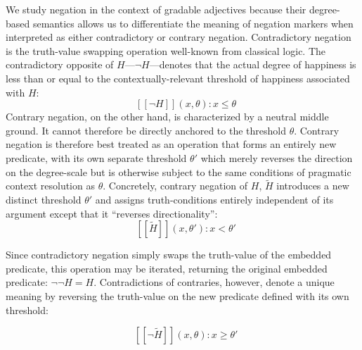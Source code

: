 \documentclass[floatsintext,doc]{apa6}
\begin{document}
We study negation in the context of gradable adjectives because their degree-based semantics allows us to differentiate the meaning of negation markers when interpreted as either contradictory or contrary negation.
Contradictory negation is the truth-value swapping operation well-known from classical logic.
The contradictory opposite of $H$---$\neg H$---denotes that the actual degree of happiness is less than or equal to the contextually-relevant threshold of happiness associated with $H$: 
\begin{equation}
\mbox{ $[\![\neg H]\!]$}(x, \theta): x \leq \theta \label{sem:neg}
\end{equation}
Contrary negation, on the other hand, is characterized by a neutral middle ground.
It cannot therefore be directly anchored to the threshold $\theta$.
Contrary negation is therefore best treated as an operation that forms an entirely new predicate, with its own separate threshold $\theta'$ which merely reverses the direction on the degree-scale but is otherwise subject to the same conditions of pragmatic context resolution as $\theta$.
Concretely, contrary negation of $H$, $\tilde{H}$ introduces a new distinct threshold \(\theta'\) and assigns truth-conditions entirely independent of its argument except that it ``reverses directionality'': 
\begin{equation}
\mbox{ $[\![ \tilde{H} ]\!]$}(x, \theta'): x < \theta' \label{sem:ant}
\end{equation}

Since contradictory negation simply swaps the truth-value of the embedded predicate, this operation may be iterated, returning the original embedded predicate: $\neg \neg H = H$. Contradictions of contraries, however, denote a unique meaning by reversing the truth-value on the new predicate defined with its own threshold:

\begin{equation}
\mbox{ $[\![\neg \tilde{H}]\!]$}(x, \theta): x \geq \theta' \label{sem:negant}
\end{equation} 
\end{document}
